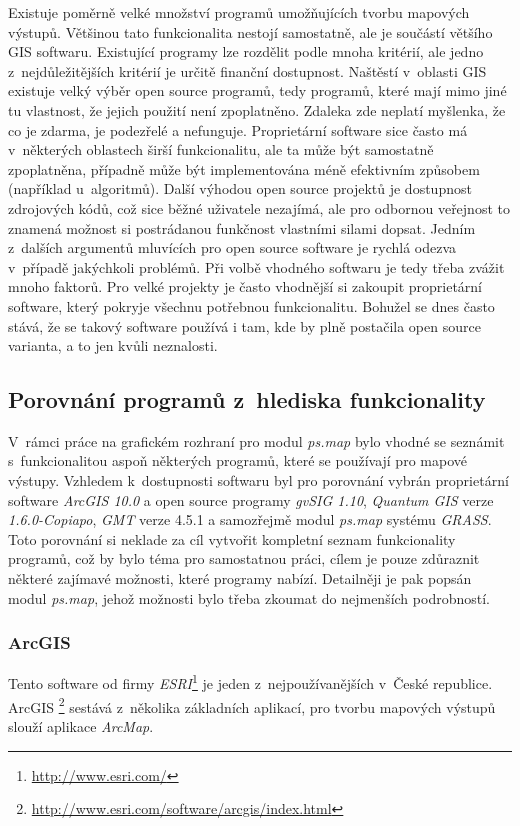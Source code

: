 \documentclass[a4paper,12pt,draft]{article}
\newcommand{\modul}[1]{\emph{#1}}
\begin{document}
Existuje poměrně velké množství programů umožňujících tvorbu
mapových výstupů. Většinou tato funkcionalita nestojí samostatně,
ale je součástí většího GIS softwaru. Existující programy lze
rozdělit podle mnoha kritérií, ale jedno z~nejdůležitějších
kritérií je určitě finanční dostupnost. Naštěstí v~oblasti GIS
existuje velký výběr open source programů, tedy programů, které mají mimo jiné
tu vlastnost, že jejich
použití není zpoplatněno. Zdaleka zde neplatí myšlenka, že co je
zdarma, je podezřelé a nefunguje. Proprietární software sice často má
v~některých oblastech širší funkcionalitu, ale ta může být samostatně
zpoplatněna, případně může být implementována méně efektivním
způsobem (například u~algoritmů). Další výhodou open source projektů
je dostupnost zdrojových kódů, což sice běžné uživatele nezajímá,
ale pro odbornou veřejnost to znamená možnost si postrádanou funkčnost
vlastními silami dopsat. Jedním z~dalších argumentů mluvících pro open
source software je rychlá odezva v~případě jakýchkoli problémů. Při
volbě vhodného softwaru je tedy třeba zvážit mnoho faktorů. Pro
velké projekty je často vhodnější si zakoupit proprietární software, který
pokryje všechnu potřebnou funkcionalitu. Bohužel se dnes často stává, že
se takový software používá i tam, kde by plně postačila
open source varianta, a to jen kvůli neznalosti.


\subsection{Porovnání  programů z~hlediska funkcionality}
V~rámci práce na grafickém rozhraní pro modul \modul{ps.map} bylo
vhodné se seznámit s~funkcionalitou aspoň některých programů, které
se používají pro mapové výstupy. Vzhledem k~dostupnosti softwaru byl
pro porovnání vybrán proprietární software \emph{ArcGIS 10.0} %
a open source programy \emph{gvSIG 1.10}, \emph{Quantum GIS} verze
\emph{1.6.0-Copiapo}, \emph{GMT} verze 4.5.1 a samozřejmě modul \modul{ps.map}
systému \emph{GRASS}.
Toto porovnání si neklade za cíl vytvořit kompletní seznam
funkcionality programů, což by bylo téma pro samostatnou práci,
cílem je pouze zdůraznit některé zajímavé možnosti, které programy
nabízí. Detailněji je pak popsán modul \modul{ps.map}, jehož možnosti
bylo třeba zkoumat do nejmenších podrobností.

\subsubsection{ArcGIS}
\label{sec:porovnani_moznosti:ArcGIS}
Tento software od firmy \emph{ESRI}\footnote{\url{http://www.esri.com/}} je
jeden z~nejpoužívanějších
v~České republice. ArcGIS
\footnote{\url{http://www.esri.com/software/arcgis/index.html}} sestává
z~několika základních aplikací,
pro tvorbu mapových výstupů slouží aplikace \emph{ArcMap}.
\end{document}
